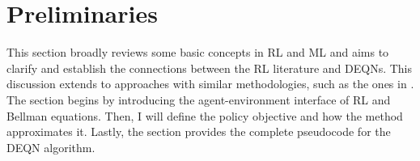\section{Preliminaries}

This section broadly reviews some basic concepts in RL and ML and aims to clarify and establish the connections between the RL literature and DEQNs. This discussion extends to approaches with similar methodologies, such as the ones in \textcite{Valaitis2024, Maliar2021}. The section begins by introducing the agent-environment interface of RL and Bellman equations. Then, I will define the policy objective and how the method approximates it. Lastly, the section provides the complete pseudocode for the DEQN algorithm. 



